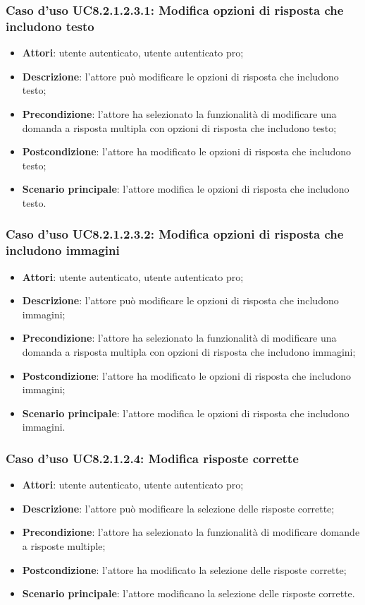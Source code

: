 \subsubsection{Caso d'uso UC8.2.1.2.3.1: Modifica opzioni di risposta che includono testo}
	\begin{itemize}
		\item
			\textbf{Attori}: utente autenticato, utente autenticato pro;
		\item		
			\textbf{Descrizione}: l'attore può modificare le opzioni di risposta che includono testo;
		\item
			\textbf{Precondizione}: l'attore ha selezionato la funzionalità di modificare una domanda a risposta multipla con opzioni di risposta che includono testo; 
		\item
			\textbf{Postcondizione}: l'attore ha modificato le opzioni di risposta che includono testo;
		\item
			\textbf{Scenario principale}: l'attore modifica le opzioni di risposta che includono testo. 			
	\end{itemize}	
	
\subsubsection{Caso d'uso UC8.2.1.2.3.2: Modifica opzioni di risposta che includono immagini}
	\begin{itemize}
		\item
			\textbf{Attori}: utente autenticato, utente autenticato pro;
		\item		
			\textbf{Descrizione}: l'attore può modificare le opzioni di risposta che includono immagini;
		\item
			\textbf{Precondizione}: l'attore ha selezionato la funzionalità di modificare una domanda a risposta multipla con opzioni di risposta che includono immagini; 
		\item
			\textbf{Postcondizione}: l'attore ha modificato le opzioni di risposta che includono immagini;
		\item
			\textbf{Scenario principale}: l'attore modifica le opzioni di risposta che includono immagini. 			
	\end{itemize}
	
\subsubsection{Caso d'uso UC8.2.1.2.4: Modifica risposte corrette}
	\begin{itemize}
		\item
			\textbf{Attori}: utente autenticato, utente autenticato pro;
		\item		
			\textbf{Descrizione}: l'attore può modificare la selezione delle risposte corrette;
		\item
			\textbf{Precondizione}: l'attore ha selezionato la funzionalità di modificare domande a risposte multiple; 
		\item
			\textbf{Postcondizione}: l'attore ha modificato la selezione delle risposte corrette;
		\item
			\textbf{Scenario principale}: l'attore modificano la selezione delle risposte corrette. 			
	\end{itemize}

	
	
	
	
	
	
	